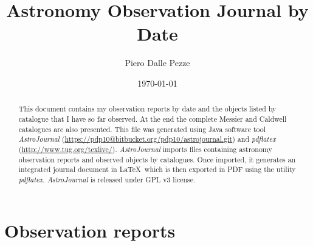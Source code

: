 \documentclass[10pt,twoside,a4paper,english]{article}
\title{Astronomy Observation Journal by Date}
\author{Piero Dalle Pezze}
\date{\today}
\begin{document}
 
 
\maketitle 
\thispagestyle{empty} 
 
\begin{abstract} 
This document contains my observation reports by date and the objects listed by catalogue that I have so far observed. At the end the complete Messier and Caldwell catalogues are also presented. This file was generated using Java software tool {\it AstroJournal} (\href{https://pdp10@bitbucket.org/pdp10/astrojournal.git}{https://pdp10@bitbucket.org/pdp10/astrojournal.git}) and {\it pdflatex} (\href{http://www.tug.org/texlive/}{http://www.tug.org/texlive/}). {\it AstroJournal} imports files containing astronomy observation reports and observed objects by catalogues. Once imported, it generates an integrated journal document in \LaTeX\ which is then exported in PDF using the utility {\it pdflatex}. {\it AstroJournal} is released under GPL v3 license. 
\end{abstract} 
 
\tableofcontents 
 
 
\clearpage 
 
 
\small 
 
\clearpage 
 
 
\normalsize 
\section{Observation reports}
\vspace{4 mm}
\hspace{4 mm}

\clearpage 

\clearpage 

\clearpage 

\clearpage 

\clearpage 

\clearpage 

\clearpage 

\clearpage 

\clearpage 

\clearpage 

\clearpage 

\clearpage 

\clearpage 

\clearpage 

\clearpage 

\clearpage 

\clearpage 

\clearpage 

\clearpage 

\clearpage 

\clearpage 

\clearpage 

\clearpage 

\clearpage 

\clearpage 

\clearpage 

\clearpage 

\clearpage 

\clearpage 
\end{document}
